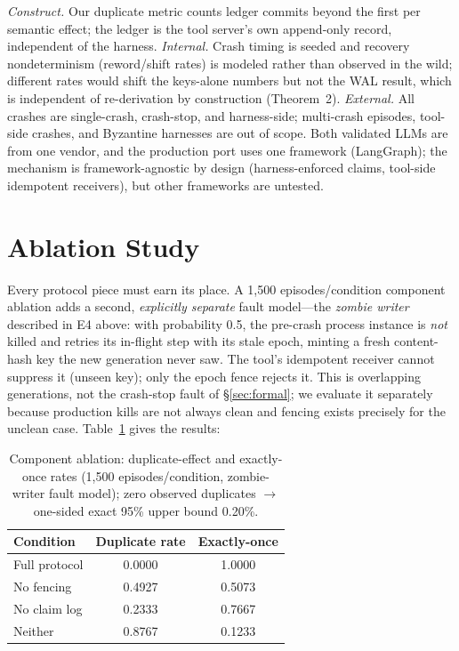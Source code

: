 \documentclass[10pt,journal,compsoc]{IEEEtran}
\begin{document}
\emph{Construct.} Our duplicate metric counts ledger commits
beyond the first per semantic effect; the ledger is the tool
server's own append-only record, independent of the harness.
\emph{Internal.} Crash timing is seeded and recovery
nondeterminism (reword/shift rates) is modeled rather than
observed in the wild; different rates would shift the keys-alone
numbers but not the WAL result, which is independent of
re-derivation by construction (Theorem~2).
\emph{External.} All crashes are single-crash, crash-stop, and
harness-side; multi-crash episodes, tool-side crashes, and
Byzantine harnesses are out of scope. Both validated LLMs are
from one vendor, and the production port uses one framework
(LangGraph); the mechanism is framework-agnostic by design
(harness-enforced claims, tool-side idempotent receivers),
but other frameworks are untested.

\section{Ablation Study}
\label{sec:ablation}

Every protocol piece must earn its place. A 1,500
episodes/condition component ablation adds a second,
\emph{explicitly separate} fault model---the \emph{zombie
writer} described in E4 above: with probability 0.5, the pre-crash
process instance is \emph{not} killed and retries its in-flight
step with its stale epoch, minting a fresh content-hash key the
new generation never saw. The tool's idempotent receiver cannot
suppress it (unseen key); only the epoch fence rejects it.
This is overlapping generations, not the crash-stop fault of
\S\ref{sec:formal}; we evaluate it separately because production
kills are not always clean and fencing exists precisely for the
unclean case. Table~\ref{tab:ablation} gives the results:

\begin{table}[ht]
\centering
\caption{Component ablation: duplicate-effect and exactly-once
rates (1,500 episodes/condition, zombie-writer fault model);
zero observed duplicates $\to$ one-sided exact 95\% upper bound
0.20\%.}
\label{tab:ablation}
\begin{tabular}{lcc}
\toprule
Condition & Duplicate rate & Exactly-once \\
\midrule
Full protocol & 0.0000 & 1.0000 \\
No fencing & 0.4927 & 0.5073 \\
No claim log & 0.2333 & 0.7667 \\
Neither & 0.8767 & 0.1233 \\
\bottomrule
\end{tabular}
\end{table}
\end{document}
